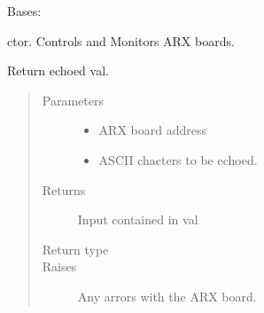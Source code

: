 \documentclass[letterpaper,10pt,english]{sphinxmanual}
\begin{document}
\begin{fulllineitems}
\label{\detokenize{index:lwautils.lwa_arx.ARX}}
Bases: 

\begin{fulllineitems}
\label{\detokenize{index:lwautils.lwa_arx.ARX.__init__}}
c\sphinxhyphen{}tor. Controls and Monitors ARX boards.

\end{fulllineitems}


\begin{fulllineitems}
\label{\detokenize{index:lwautils.lwa_arx.ARX.echo}}
Return echoed val.
\begin{quote}\begin{description}
\item[{Parameters}] \leavevmode\begin{itemize}
\item {} 
 \textendash{} ARX board address

\item {} 
 \textendash{} ASCII chacters to be echoed.

\end{itemize}

\item[{Returns}] \leavevmode
Input contained in val

\item[{Return type}] \leavevmode
{}

\item[{Raises}] \leavevmode
{} \textendash{} Any arrors with the ARX board.

\end{description}\end{quote}


\end{fulllineitems}
\end{fulllineitems}
\end{document}
